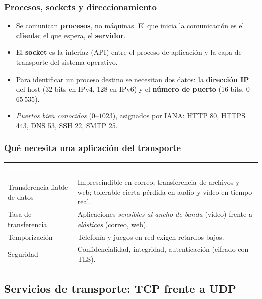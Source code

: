 \documentclass[11pt,a4paper]{article}
\newcommand{\hd}[1]{\cellcolor{uahblue}\textcolor{white}{\textbf{#1}}}
\begin{document}
\subsubsection{Procesos, sockets y direccionamiento}
\begin{itemize}
  \item Se comunican \textbf{procesos}, no máquinas. El que inicia la comunicación es el \textbf{cliente}; el que espera, el \textbf{servidor}.
  \item El \textbf{socket} es la interfaz (API) entre el proceso de aplicación y la capa de transporte del sistema operativo.
  \item Para identificar un proceso destino se necesitan dos datos: la \textbf{dirección IP} del host (32 bits en IPv4, 128 en IPv6) y el \textbf{número de puerto} (16 bits, $0$--$65\,535$).
  \item \emph{Puertos bien conocidos} ($0$--$1023$), asignados por IANA: HTTP 80, HTTPS 443, DNS 53, SSH 22, SMTP 25.
\end{itemize}

\subsubsection{Qué necesita una aplicación del transporte}

\begin{tabularx}{\textwidth}{@{}L{3.6cm}X@{}}
\toprule
\hd{Requisito} & \hd{Ejemplo} \\
\midrule
Transferencia fiable de datos & Imprescindible en correo, transferencia de archivos y web; tolerable cierta pérdida en audio y vídeo en tiempo real. \\
Tasa de transferencia & Aplicaciones \emph{sensibles al ancho de banda} (vídeo) frente a \emph{elásticas} (correo, web). \\
Temporización & Telefonía y juegos en red exigen retardos bajos. \\
Seguridad & Confidencialidad, integridad, autenticación (cifrado con TLS). \\
\bottomrule
\end{tabularx}

\subsection{Servicios de transporte: TCP frente a UDP}
\end{document}
